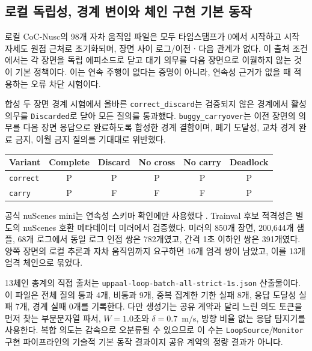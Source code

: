\subsection{로컬 독립성, 경계 변이와 체인 구현 기본 동작}
\label{sec:results-rq3}

로컬 CoC-Nusc의 98개 자차 움직임 파일은 모두 타임스탬프가 0에서 시작하고 시작 자세도 원점 근처로 초기화되며, 장면 사이 로그/이전ㆍ다음 관계가 없다. 이 출처 조건에서는 각 장면을 독립 에피소드로 닫고 대기 의무를 다음 장면으로 이월하지 않는 것이 기본 정책이다. 이는 연속 주행이 없다는 증명이 아니라, 연속성 근거가 없을 때 적용하는 오류 차단 시험이다.

합성 두 장면 경계 시험에서 올바른 \texttt{correct\_discard}는 검증되지 않은 경계에서 활성 의무를 \texttt{Discarded}로 닫아 모든 질의를 통과했다. \texttt{buggy\_carryover}는 이전 장면의 의무를 다음 장면 응답으로 완료하도록 합성한 경계 결함이며, 폐기 도달성, 교차 경계 완료 금지, 이월 금지 질의를 기대대로 위반했다.

\begin{table}[t]
\centering
{}
\label{tab:boundary-negative-control}
\scriptsize
\begin{tabular}{lccccc}
\toprule
Variant & Complete & Discard & No cross & No carry & Deadlock \\
\midrule
\texttt{correct} & P & P & P & P & P \\
\texttt{carry} & P & F & F & F & P \\
\bottomrule
\end{tabular}
\end{table}

공식 nuScenes mini는 연속성 스키마 확인에만 사용했다 \cite{nuscenes2026website}. Trainval 후보 적격성은 별도의 nuScenes 호환 메타데이터 미러에서 검증했다. 미러의 850개 장면, 200,644개 샘플, 68개 로그에서 동일 로그 인접 쌍은 782개였고, 간격 1초 이하인 쌍은 391개였다. 양쪽 장면의 로컬 추론과 자차 움직임까지 요구하면 16개 엄격 쌍이 남았고, 이를 13개 엄격 체인으로 묶었다.

13체인 총계의 직접 출처는 \texttt{uppaal-loop-batch-all-strict-1s.json} 산출물이다. 이 파일은 전체 질의 통과 4개, 비통과 9개, 중복 집계한 기한 실패 8개, 응답 도달성 실패 7개, 경계 실패 0개를 기록한다. 다만 생성기는 공유 계약과 달리 느린 의도 토큰을 먼저 찾는 부분문자열 파서, $W=1.0$초와 $\delta=0.7$~m/s, 방향 비율 없는 응답 탐지기를 사용한다. 복합 의도는 감속으로 오분류될 수 있으므로 이 수는 \texttt{LoopSource}/\texttt{Monitor} 구현 파이프라인의 기술적 기본 동작 결과이지 공유 계약의 정량 결과가 아니다.

